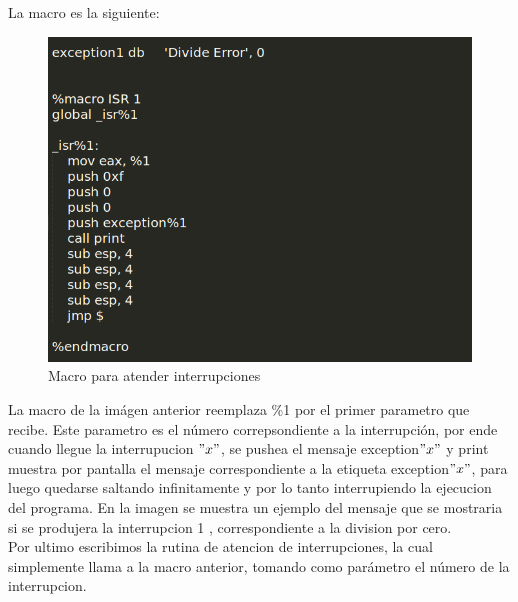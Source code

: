 La macro es la siguiente:
  \begin{figure}[H]
\begin{center}
  \includegraphics[width=\linewidth]{ejercicio2/macro.png}
  \caption{{\small Macro para atender interrupciones} }
\endminipage
\end{center}
\end{figure}

La macro de la imágen anterior reemplaza  \%1 por el primer parametro que recibe. Este parametro es el número correpsondiente a la interrupción, por ende cuando llegue la interrupucion $"x"$, se pushea el mensaje exception$"x"$ y print muestra por pantalla el mensaje correspondiente a la etiqueta exception$"x"$, para luego quedarse saltando infinitamente y por lo tanto interrupiendo la ejecucion del programa. En la imagen se muestra un ejemplo del mensaje que se mostraria si se produjera la interrupcion 1 , correspondiente a la division por cero.\\

Por ultimo escribimos la rutina de atencion de interrupciones, la cual simplemente llama a la macro anterior, tomando como parámetro el número de la interrupcion.

